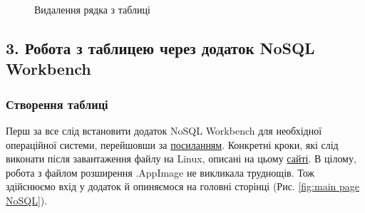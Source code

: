 \documentclass[a4paper,14pt]{extarticle} %
\begin{document}
\begin{figure}[H]
    \begin{minipage}[H]{1\linewidth}
    \end{minipage}
    \vfill
    \begin{minipage}[H]{1\linewidth}
        \caption{Видалення рядка з таблиці}
        \label{fig:delete the element AWS CLI}
    \end{minipage}
\end{figure}

\subsection*{3. Робота з таблицею через додаток NoSQL Workbench}

\subsubsection*{Створення таблиці}

Перш за все слід встановити додаток NoSQL Workbench для необхідної операційної системи, перейшовши за
\href{https://docs.aws.amazon.com/amazondynamodb/latest/developerguide/workbench.settingup.html}{посиланням}. 
Конкретні кроки, які слід виконати після завантаження файлу на Linux, описані на цьому 
\href{https://itsfoss.com/use-appimage-linux/}{сайті}. В цілому, робота з файлом розширення .AppImage не викликала 
труднощів. Тож здійснюємо вхід у додаток й опиняємося на головні сторінці (Рис. \ref{fig:main page NoSQL}).
\end{document}
